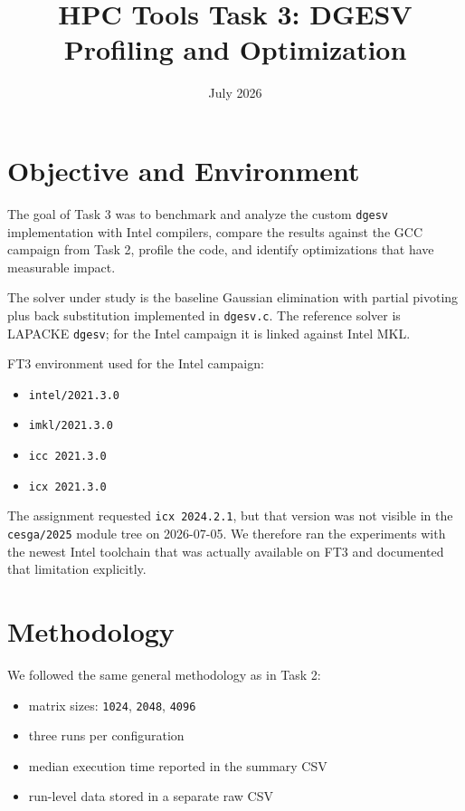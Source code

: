 \documentclass[11pt,a4paper]{article}
\title{HPC Tools Task 3: DGESV Profiling and Optimization}
\author{}
\date{July 2026}
\begin{document}
\maketitle

\section{Objective and Environment}

The goal of Task 3 was to benchmark and analyze the custom \texttt{dgesv}
implementation with Intel compilers, compare the results against the GCC
campaign from Task 2, profile the code, and identify optimizations that have
measurable impact.

The solver under study is the baseline Gaussian elimination with partial
pivoting plus back substitution implemented in \texttt{dgesv.c}. The reference
solver is LAPACKE \texttt{dgesv}; for the Intel campaign it is linked against
Intel MKL.

FT3 environment used for the Intel campaign:

\begin{itemize}
\item \texttt{intel/2021.3.0}
\item \texttt{imkl/2021.3.0}
\item \texttt{icc 2021.3.0}
\item \texttt{icx 2021.3.0}
\end{itemize}

The assignment requested \texttt{icx 2024.2.1}, but that version was not
visible in the \texttt{cesga/2025} module tree on 2026-07-05. We therefore ran
the experiments with the newest Intel toolchain that was actually available on
FT3 and documented that limitation explicitly.

\section{Methodology}

We followed the same general methodology as in Task 2:

\begin{itemize}
\item matrix sizes: \texttt{1024}, \texttt{2048}, \texttt{4096}
\item three runs per configuration
\item median execution time reported in the summary CSV
\item run-level data stored in a separate raw CSV
\end{itemize}
\end{document}
